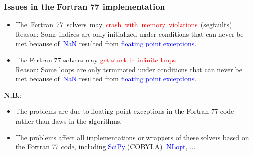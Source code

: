 \documentclass[slidestop,mathserif,xcolor=dvipsnames]{beamer}
\newcommand{\blue}[1]{\textcolor{blue}{#1}}
\newcommand{\red}[1]{\textcolor{red}{#1}}
\newcommand{\nb}{\textbf{N.B.}}
\begin{document}
\begin{frame}
\frametitle{Issues in the Fortran 77 implementation}

    \vspace{1ex}
    \begin{itemize}
        \item\mbox{The Fortran 77 solvers may \red{crash with memory violations}~(segfaults).}
        \\Reason: Some indices are only initialized under conditions that can never be met because
        of~\blue{NaN} resulted from  \blue{floating point exceptions}.
        \vspace{0.5ex}
    \item The Fortran 77 solvers may \red{get stuck in infinite loops}.
        \\Reason: Some loops are only terminated under conditions that can never be met because
        of~\blue{NaN} resulted from  \blue{floating point exceptions}.
    \end{itemize}

    \vspace{1ex}
    \nb:
    \begin{itemize}
     \item The problems are due to floating point exceptions in the Fortran 77 code rather than flaws in the algorithms.
         \vspace{0.5ex}
     \item The problems affect all implementations or wrappers of these solvers based on the Fortran 77
         code, including \blue{SciPy} (COBYLA), \blue{NLopt}, ...
    \end{itemize}
\end{frame}

\end{document}
